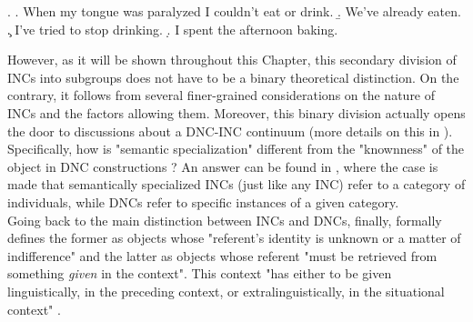 \ex. \label{fillmore} \a. \label{fillmore1} When my tongue was paralyzed I couldn't eat or drink.
\b. \label{fillmore2} We've already eaten.
\c. \label{fillmore3} I've tried to stop drinking.
\d. \label{fillmore4} I spent the afternoon baking.

However, as it will be shown throughout this Chapter, this secondary division of INCs into subgroups does not have to be a binary theoretical distinction. On the contrary, it follows from several finer-grained considerations on the nature of INCs and the factors allowing them. Moreover, this binary division actually opens the door to discussions about a DNC-INC continuum (more details on this in ). Specifically, how is "semantic specialization" different from the "knownness" of the object in DNC constructions \parencite[525]{Eu2018}? An answer can be found in \textcite[218]{Allerton1975}, where the case is made that semantically specialized INCs (just like any INC) refer to a category of individuals, while DNCs refer to specific instances of a given category.\\
Going back to the main distinction between INCs and DNCs, finally, \textcite{Fillmore1986} formally defines the former as objects whose "referent's identity is unknown or a matter of indifference" and the latter as objects whose referent "must be retrieved from something \textit{given} in the context". This context "has either to be given linguistically, in the preceding context, or extralinguistically, in the situational context" \parencite[13]{StarkMeier2017}.

